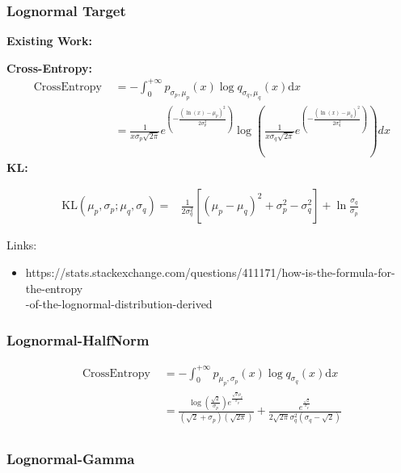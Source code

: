 \documentclass{article}
\begin{document}
\subsubsection{Lognormal Target}

\noindent \textbf{Existing Work:}

\noindent \textbf{Cross-Entropy:}
$$ \begin{aligned} \text { CrossEntropy }&=-\int_{0}^{+\infty} p_{\sigma_{p},\mu_{p}}(x) \log q_{\sigma_{q},\mu_{q}}(x) \mathrm{d} x\\
&=\frac{1}{x \sigma_{p} \sqrt{2 \pi}} e^{\left(-\frac{(\ln (x)-\mu_{p})^{2}}{2 \sigma_{p}^{2}}\right)}\log(\frac{1}{x \sigma_{q} \sqrt{2 \pi}} e^{\left(-\frac{(\ln (x)-\mu_{q})^{2}}{2 \sigma_{q}^{2}}\right)})dx
\end{aligned} $$
\noindent \textbf{KL:}

$$ \begin{aligned}
\mathrm{KL}\left(\mu_{p}, \sigma_{p} ; \mu_{q}, \sigma_{q}\right)=&\frac{1}{2 \sigma_{q}^{2}}\left[\left(\mu_{p}-\mu_{q}\right)^{2}+\sigma_{p}^{2}-\sigma_{q}^{2}\right]+\ln \frac{\sigma_{q}}{\sigma_{p}}
\end{aligned} $$

Links:
\begin{itemize}
 \item  https://stats.stackexchange.com/questions/411171/how-is-the-formula-for-the-entropy\\-of-the-lognormal-distribution-derived
\end{itemize}

\subsubsection{Lognormal-HalfNorm}

$$ \begin{aligned} \text { CrossEntropy }&=-\int_{0}^{+\infty} p_{\mu_{p},\sigma_{p}}(x) \log q_{\sigma_{q}}(x) \mathrm{d} x \\
&=\frac{\log(\frac{\sqrt{2}}{\sigma_{p}} )e^{\frac{\sqrt{2}\mu_{p}}{\sigma_{p}} }}{(\sqrt{2}+\sigma_{p})(\sqrt{2\pi})}+\frac{e^{\frac{\sqrt2}{\sigma_{q}}}}{2\sqrt{2\pi}\sigma^{2}_{q}(\sigma_{q}-\sqrt{2})} \\
\end{aligned} $$

\subsubsection{Lognormal-Gamma}
\end{document}
